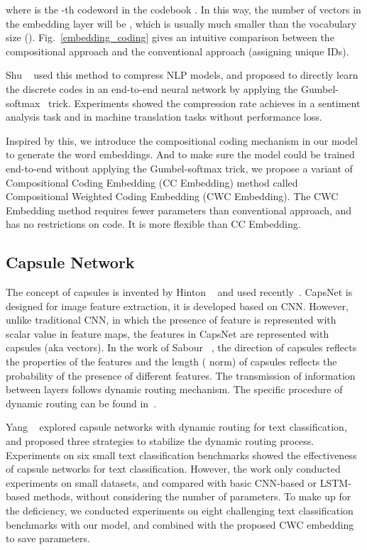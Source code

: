 \documentclass[times,twocolumn,final]{elsarticle}
\begin{document}
where  is the -th codeword in the codebook . In this way, the number of vectors in the embedding layer will be , which is usually much smaller than the vocabulary size (). Fig.~\ref{embedding_coding} gives an intuitive comparison between the compositional approach and the conventional approach (assigning unique IDs).

Shu \etal~\cite{shu2018compressing} used this method to compress NLP models, and proposed to directly learn the discrete codes in an end-to-end neural network by applying the Gumbel-softmax~\cite{maddison2017concrete, jang2017categorical} trick. Experiments showed the compression rate achieves  in a sentiment analysis task and  in machine translation tasks without performance loss.

Inspired by this, we introduce the compositional coding mechanism in our model to generate the word embeddings. And to make sure the model could be trained end-to-end without applying the Gumbel-softmax trick, we propose a variant of Compositional Coding Embedding (CC Embedding) method called Compositional Weighted Coding Embedding (CWC Embedding). The CWC Embedding method requires fewer parameters than conventional approach, and has no restrictions on code. It is more flexible than CC Embedding.

\subsection{Capsule Network}

The concept of capsules is invented by Hinton \etal~\cite{hinton2011transforming} and used recently~\cite{sabour2017dynamic, hinton2018matrix}. CapsNet is designed for image feature extraction, it is developed based on CNN. However, unlike traditional CNN, in which the presence of feature is represented with scalar value in feature maps, the features in CapsNet are represented with capsules (aka vectors). In the work of Sabour \etal~\cite{sabour2017dynamic}, the direction of capsules reflects the properties of the features and the length ( norm) of capsules reflects the probability of the presence of different features. The transmission of information between layers follows dynamic routing mechanism. The specific procedure of dynamic routing can be found in~\cite{sabour2017dynamic}.

Yang \etal~\cite{yang2018investigating} explored capsule networks with dynamic routing for text classification, and proposed three strategies to stabilize the dynamic routing process. Experiments on six small text classification benchmarks showed the effectiveness of capsule networks for text classification. However, the work only conducted experiments on small datasets, and compared with basic CNN-based or LSTM-based methods, without considering the number of parameters. To make up for the deficiency, we conducted experiments on eight challenging text classification benchmarks with our model, and combined with the proposed CWC embedding to save parameters.
\end{document}
